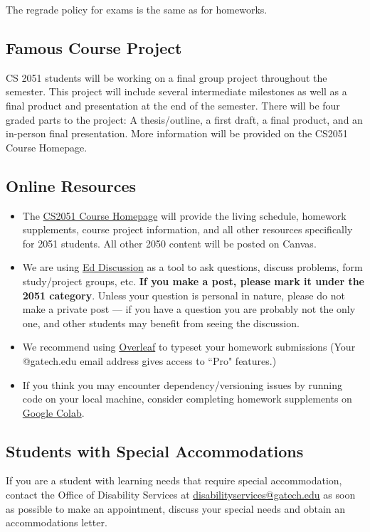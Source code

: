 \documentclass{article}
\begin{document}
    \vspace{3mm}
    The regrade policy for exams is the same as for homeworks.

\subsection*{Famous Course Project}
    CS 2051 students will be working on a final group project throughout the semester. This project will include several intermediate milestones as well as a final product and presentation at the end of the semester. There will be four graded parts to the project: A thesis/outline, a first draft, a final product, and an in-person final presentation. More information will be provided on the CS2051 Course Homepage.

\subsection*{Online Resources}
    \begin{itemize}
        \item The \href{https://github.com/sar-mo/CS2051-HonorsDiscreteMath}{CS2051 Course Homepage} will provide the living schedule, homework supplements, course project information, and all other resources specifically for 2051 students. All other 2050 content will be posted on Canvas.
        \item We are using \href{https://edstem.org/}{Ed Discussion} as a tool to ask questions, discuss problems, form study/project groups, etc. \textbf{If you make a post, please mark it under the 2051 category}. Unless your question is personal in nature, please do not make a private post — if you have a question you are probably not the only one, and other students may benefit from seeing the discussion.
        \item We recommend using \href{https://overleaf.com}{Overleaf} to typeset your homework submissions (Your @gatech.edu email address gives access to ``Pro" features.)
        \item If you think you may encounter dependency/versioning issues by running code on your local machine, consider completing homework supplements on \href{https://colab.research.google.com/}{Google Colab}.
    \end{itemize}

\subsection*{Students with Special Accommodations}
If you are a student with learning needs that require special accommodation, contact the Office of Disability Services at \url{disabilityservices@gatech.edu} as soon as possible to make an appointment, discuss your special needs and obtain an accommodations letter.
\end{document}
